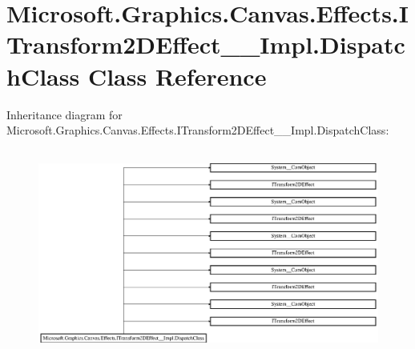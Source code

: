 \hypertarget{class_microsoft_1_1_graphics_1_1_canvas_1_1_effects_1_1_i_transform2_d_effect_____impl_1_1_dispatch_class}{}\section{Microsoft.\+Graphics.\+Canvas.\+Effects.\+I\+Transform2\+D\+Effect\+\_\+\+\_\+\+Impl.\+Dispatch\+Class Class Reference}
\label{class_microsoft_1_1_graphics_1_1_canvas_1_1_effects_1_1_i_transform2_d_effect_____impl_1_1_dispatch_class}
Inheritance diagram for Microsoft.\+Graphics.\+Canvas.\+Effects.\+I\+Transform2\+D\+Effect\+\_\+\+\_\+\+Impl.\+Dispatch\+Class\+:\begin{figure}[H]
\begin{center}
\leavevmode
\includegraphics[height=6.829268cm]{class_microsoft_1_1_graphics_1_1_canvas_1_1_effects_1_1_i_transform2_d_effect_____impl_1_1_dispatch_class}
\end{center}
\end{figure}
